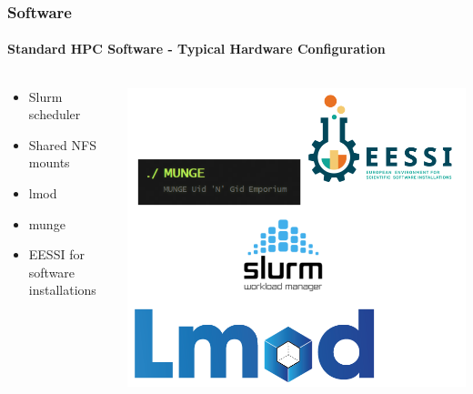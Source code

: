 \begin{frame}
	\frametitle{Software}
	\framesubtitle{Standard HPC Software - Typical Hardware Configuration}
	
	\begin{columns}[T]
		\begin{column}[c]{.5\textwidth}
			\begin{itemize}
				\item Slurm scheduler
				\item Shared NFS mounts
				\item lmod
				\item munge
				\item EESSI for software installations
			\end{itemize}
		\end{column}
		\begin{column}[c]{.5\textwidth}
			\centering
			\includegraphics[width=.8\textwidth]{images/logos.png}
		\end{column}
	\end{columns}
\end{frame}
